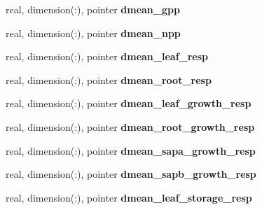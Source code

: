 \begin{DoxyCompactItemize}
\item 
\hypertarget{structed__state__vars_1_1edtype_a8d06c60770478ccb70f23c3e16b8a430}{
real, dimension(:), pointer {\bfseries dmean\_\-gpp}}
\label{structed__state__vars_1_1edtype_a8d06c60770478ccb70f23c3e16b8a430}

\item 
\hypertarget{structed__state__vars_1_1edtype_ae3d2d143c5578744c46da1881c5d67ee}{
real, dimension(:), pointer {\bfseries dmean\_\-npp}}
\label{structed__state__vars_1_1edtype_ae3d2d143c5578744c46da1881c5d67ee}

\item 
\hypertarget{structed__state__vars_1_1edtype_aa2c95d2f0c76495778557734a4a295c1}{
real, dimension(:), pointer {\bfseries dmean\_\-leaf\_\-resp}}
\label{structed__state__vars_1_1edtype_aa2c95d2f0c76495778557734a4a295c1}

\item 
\hypertarget{structed__state__vars_1_1edtype_aff32e5f06c1a6c12f9ac1baee46d26ab}{
real, dimension(:), pointer {\bfseries dmean\_\-root\_\-resp}}
\label{structed__state__vars_1_1edtype_aff32e5f06c1a6c12f9ac1baee46d26ab}

\item 
\hypertarget{structed__state__vars_1_1edtype_adaf0840644acd888dc353447df753198}{
real, dimension(:), pointer {\bfseries dmean\_\-leaf\_\-growth\_\-resp}}
\label{structed__state__vars_1_1edtype_adaf0840644acd888dc353447df753198}

\item 
\hypertarget{structed__state__vars_1_1edtype_ad5194574c9bb9690de0bae4c141128f6}{
real, dimension(:), pointer {\bfseries dmean\_\-root\_\-growth\_\-resp}}
\label{structed__state__vars_1_1edtype_ad5194574c9bb9690de0bae4c141128f6}

\item 
\hypertarget{structed__state__vars_1_1edtype_a6aeb55eb089484ca77d4455da7445519}{
real, dimension(:), pointer {\bfseries dmean\_\-sapa\_\-growth\_\-resp}}
\label{structed__state__vars_1_1edtype_a6aeb55eb089484ca77d4455da7445519}

\item 
\hypertarget{structed__state__vars_1_1edtype_a2beb18f4d82570278b206d6cde0ca87b}{
real, dimension(:), pointer {\bfseries dmean\_\-sapb\_\-growth\_\-resp}}
\label{structed__state__vars_1_1edtype_a2beb18f4d82570278b206d6cde0ca87b}

\item 
\hypertarget{structed__state__vars_1_1edtype_a77d3464539727dfe3dc588d71b166967}{
real, dimension(:), pointer {\bfseries dmean\_\-leaf\_\-storage\_\-resp}}
\label{structed__state__vars_1_1edtype_a77d3464539727dfe3dc588d71b166967}


\end{DoxyCompactItemize}
